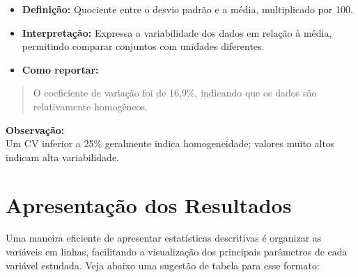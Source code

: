\documentclass[
]{book}
\providecommand{\tightlist}{%
  \setlength{\itemsep}{0pt}\setlength{\parskip}{0pt}}
\begin{document}
\begin{itemize}
\tightlist
\item
  \textbf{Definição:} Quociente entre o desvio padrão e a média, multiplicado por 100.\\
\item
  \textbf{Interpretação:} Expressa a variabilidade dos dados em relação à média, permitindo comparar conjuntos com unidades diferentes.\\
\item
  \textbf{Como reportar:}
\end{itemize}

\begin{quote}
O coeficiente de variação foi de 16,9\%, indicando que os dados são relativamente homogêneos.
\end{quote}

\textbf{Observação:}\\
Um CV inferior a 25\% geralmente indica homogeneidade; valores muito altos indicam alta variabilidade.

\section{Apresentação dos Resultados}\label{apresentauxe7uxe3o-dos-resultados}

Uma maneira eficiente de apresentar estatísticas descritivas é organizar as variáveis em linhas, facilitando a visualização dos principais parâmetros de cada variável estudada. Veja abaixo uma sugestão de tabela para esse formato:
\end{document}
